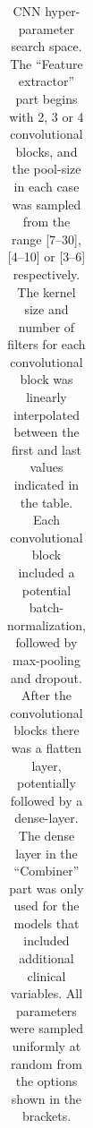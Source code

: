 \documentclass[preprint]{elsarticle}
\begin{document}
\begin{table}[H]
\begin{adjustbox}{center}
\begin{tabular}{@{}lr@{}}
\bottomrule
\end{tabular}
\end{adjustbox}
\caption{CNN hyper-parameter search space. The ``Feature extractor'' part begins with 2, 3 or 4 convolutional blocks, and the pool-size in each case was sampled from the range [7--30], [4--10] or [3--6] respectively. The kernel size and number of filters for each convolutional block was linearly interpolated between the first and last values indicated in the table. Each convolutional block included a potential batch-normalization, followed by max-pooling and dropout. After the convolutional blocks there was a flatten layer, potentially followed by a dense-layer. The dense layer in the ``Combiner'' part was only used for the models that included additional clinical variables. All parameters were sampled uniformly at random from the options shown in the brackets.}
\label{table:cnn}
\end{table}

\end{document}
